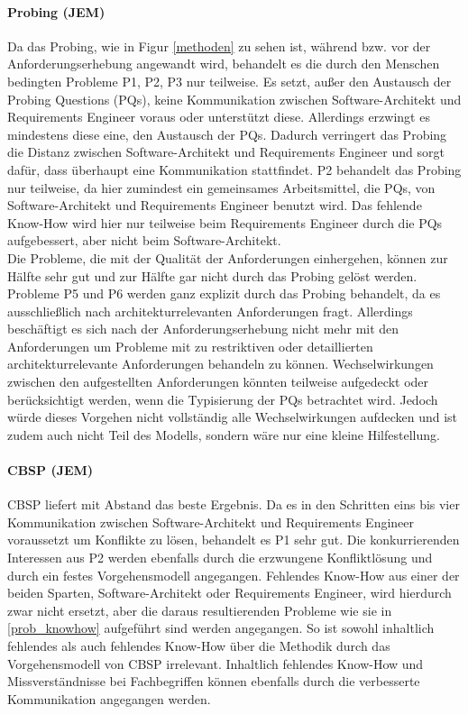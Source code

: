 \paragraph{Probing (JEM)}
Da das Probing, wie in Figur \ref{methoden} zu sehen ist, w\"ahrend bzw. vor der Anforderungserhebung angewandt wird, behandelt es die durch den Menschen bedingten Probleme P1, P2, P3 nur teilweise. Es setzt, au\ss{}er den Austausch der Probing Questions (PQs), keine Kommunikation zwischen Software-Architekt und Requirements Engineer voraus oder unterst\"utzt diese. Allerdings erzwingt es mindestens diese eine, den Austausch der PQs. Dadurch verringert das Probing die Distanz zwischen Software-Architekt und Requirements Engineer und  sorgt daf\"ur, dass \"uberhaupt eine Kommunikation stattfindet. P2 behandelt das Probing nur teilweise, da hier zumindest ein gemeinsames Arbeitsmittel, die PQs, von Software-Architekt und Requirements Engineer benutzt wird. Das fehlende Know-How wird hier nur teilweise beim Requirements Engineer durch die PQs aufgebessert, aber nicht beim Software-Architekt. \\

Die Probleme, die mit der Qualit\"at der Anforderungen einhergehen, k\"onnen zur H\"alfte sehr gut und zur H\"alfte gar nicht durch das Probing gel\"ost werden. Probleme P5 und P6 werden ganz explizit durch das Probing behandelt, da es ausschlie\ss{}lich nach architekturrelevanten Anforderungen fragt. Allerdings besch\"aftigt es sich nach der Anforderungserhebung nicht mehr mit den Anforderungen um Probleme mit zu restriktiven oder detaillierten architekturrelevante Anforderungen behandeln zu k\"onnen. Wechselwirkungen zwischen den aufgestellten Anforderungen k\"onnten teilweise aufgedeckt oder ber\"ucksichtigt werden, wenn die Typisierung der PQs betrachtet wird. Jedoch w\"urde dieses Vorgehen nicht vollst\"andig alle Wechselwirkungen aufdecken und ist zudem auch nicht Teil des Modells, sondern w\"are nur eine kleine Hilfestellung. \\

\paragraph{CBSP (JEM)}
CBSP liefert mit Abstand das beste Ergebnis. Da es in den Schritten eins bis vier Kommunikation zwischen Software-Architekt und Requirements Engineer voraussetzt um Konflikte zu l\"osen, behandelt es P1 sehr gut. Die konkurrierenden Interessen aus P2 werden ebenfalls durch die erzwungene Konfliktl\"osung und durch ein festes Vorgehensmodell angegangen. Fehlendes Know-How aus einer der beiden Sparten, Software-Architekt oder Requirements Engineer, wird hierdurch zwar nicht ersetzt, aber die daraus resultierenden Probleme wie sie in \ref{prob_knowhow} aufgef\"uhrt sind werden angegangen. So ist sowohl inhaltlich fehlendes als auch fehlendes Know-How \"uber die Methodik durch das Vorgehensmodell von CBSP irrelevant. Inhaltlich fehlendes Know-How und Missverst\"andnisse bei Fachbegriffen k\"onnen ebenfalls durch die verbesserte Kommunikation angegangen werden. \\

